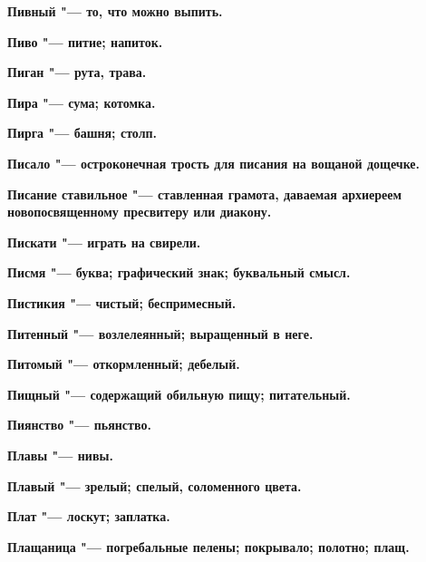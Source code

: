 \bfseries Пивный \normalfont{} "--- то, что можно выпить. 




\bfseries Пиво \normalfont{} "--- питие; напиток. 




\bfseries Пиган \normalfont{} "--- рута, трава. 




\bfseries Пира \normalfont{} "--- сума; котомка. 




\bfseries Пирга \normalfont{} "--- башня; столп. 




\bfseries Писало \normalfont{} "--- остроконечная трость для писания на вощаной дощечке. 




\bfseries Писание ставильное \normalfont{} "--- ставленная грамота, даваемая архиереем новопосвященному пресвитеру или диакону. 




\bfseries Пискати \normalfont{} "--- играть на свирели. 




\bfseries Писмя \normalfont{} "--- буква; графический знак; буквальный смысл. 




\bfseries Пистикия \normalfont{} "--- чистый; беспримесный. 




\bfseries Питенный \normalfont{} "--- возлелеянный; выращенный в неге. 




\bfseries Питомый \normalfont{} "--- откормленный; дебелый. 




\bfseries Пищный \normalfont{} "--- содержащий обильную пищу; питательный. 




\bfseries Пиянство \normalfont{} "--- пьянство. 




\bfseries Плавы \normalfont{} "--- нивы. 




\bfseries Плавый \normalfont{} "--- зрелый; спелый, соломенного цвета. 




\bfseries Плат \normalfont{} "--- лоскут; заплатка. 




\bfseries Плащаница \normalfont{} "--- погребальные пелены; покрывало; полотно; плащ. 




